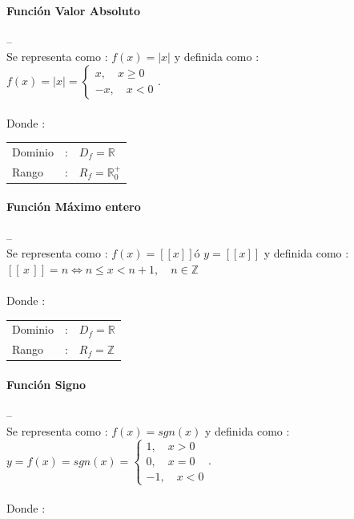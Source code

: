 \documentclass[11pt, twocolumn, landscape, a4paper]{article}
\begin{document}
\paragraph*{Función Valor Absoluto} -- \\ \noindent Se representa como : $f(x) = |x|$ y definida como : $f(x) = |x| = \left\{\begin{aligned} x,\quad x \ge 0 \\ -x,\quad x < 0 \end{aligned} \right.$. \\ \\ \noindent Donde : \\

\begin{tabular}{lcl}
Dominio & : & $D_{f} = \mathbb{R}$ \\
Rango & : & $R_{f} = \mathbb{R}^{+}_{0}$
\end{tabular}

\paragraph*{Función Máximo entero} -- \\ \noindent Se representa como : $f(x) = [\![ x ]\!]$\quad ó \quad$y = [\![x]\!]$ y definida como : $[\![\,x\,]\!] = n \iff n \le x < n + 1,\quad n \in \mathbb{Z}$ \\ \\ \noindent Donde : \\
\begin{tabular}{lcl}
Dominio & : & $D_{f} = \mathbb{R}$ \\
Rango & : & $R_{f} = \mathbb{Z}$
\end{tabular}

\paragraph*{Función Signo} -- \\ \noindent Se representa como : $f(x) = sgn(x)$ y definida como : \\ $y = f(x) = sgn(x) = \left\{\begin{aligned} 1,\quad x > 0 \\ 0,\quad x = 0 \\ -1,\quad x < 0 \end{aligned} \right.$. \\ \\ \noindent Donde : \\
\end{document}
